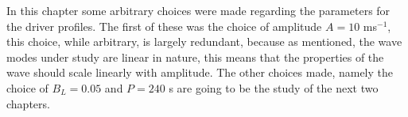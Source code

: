 In this chapter some arbitrary choices were made regarding the parameters for the driver profiles.
The first of these was the choice of amplitude $A=10$ ms$^{-1}$, this choice, while arbitrary, is largely redundant, because as mentioned, the wave modes under study are linear in nature, this means that the properties of the wave should scale linearly with amplitude.
The other choices made, namely the choice of $B_L = 0.05$ and $P=240$ s are going to be the study of the next two chapters.


